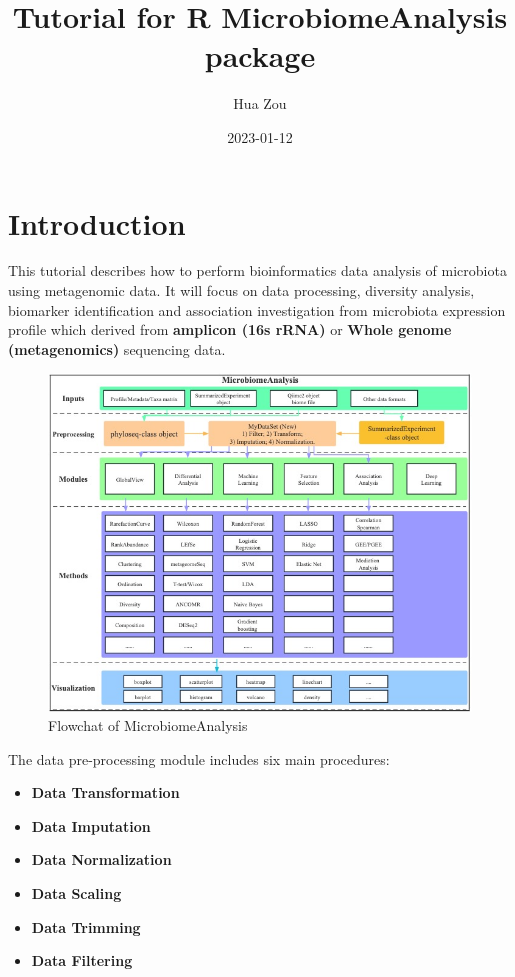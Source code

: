 \documentclass[
]{book}
\title{Tutorial for R MicrobiomeAnalysis package}
\author{Hua Zou}
\date{2023-01-12}
\providecommand{\tightlist}{%
  \setlength{\itemsep}{0pt}\setlength{\parskip}{0pt}}
\begin{document}
\maketitle

{
\setcounter{tocdepth}{1}
\tableofcontents
}
\hypertarget{introduction}{%
\chapter{Introduction}\label{introduction}}

This tutorial describes how to perform bioinformatics data analysis of microbiota using metagenomic data. It will focus on data processing, diversity analysis, biomarker identification and association investigation from microbiota expression profile which derived from \textbf{amplicon (16s rRNA)} or \textbf{Whole genome (metagenomics)} sequencing data.

\begin{figure}

{\centering \includegraphics[width=1\linewidth,height=1\textheight]{./figures/Schematic} 

}

\caption{Flowchat of MicrobiomeAnalysis}\label{fig:unnamed-chunk-1}
\end{figure}

The data pre-processing module includes six main procedures:

\begin{itemize}
\tightlist
\item
  \textbf{Data Transformation}
\item
  \textbf{Data Imputation}
\item
  \textbf{Data Normalization}
\item
  \textbf{Data Scaling}
\item
  \textbf{Data Trimming}
\item
  \textbf{Data Filtering}
\end{itemize}
\end{document}
